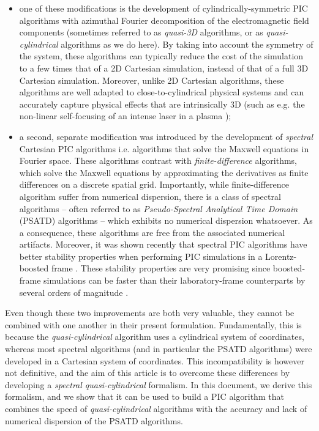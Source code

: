\documentclass[1p,times]{elsarticle}
\begin{document}
\begin{itemize}
\item one of these modifications is the development of cylindrically-symmetric
PIC algorithms with azimuthal Fourier decomposition \citep{godfrey1985iprop,Lifschitz,Davidson} 
of the electromagnetic field components 
(sometimes referred to as \emph{quasi-3D} algorithms, or as
\emph{quasi-cylindrical} algorithms as we do here). By taking
into account the symmetry of the system, these algorithms can typically reduce
the cost of the simulation to a few times that of a 2D Cartesian simulation,
instead of that of a full 3D Cartesian simulation. Moreover, unlike 2D
Cartesian algorithms, these algorithms are well adapted to close-to-cylindrical
physical systems and can accurately capture physical effects that are intrinsically
3D (such as e.g. the non-linear self-focusing of an intense laser in a
plasma \citep{EsareyRMP2009});

\item a second, separate modification was introduced by the development
  of \emph{spectral} Cartesian PIC algorithms
  \citep{Haber,BunemanJCP1980,DawsonRMP1983} i.e. algorithms that solve the
  Maxwell equations in Fourier space. These algorithms contrast with
  \emph{finite-difference} algorithms, which solve the Maxwell equations
  by approximating the derivatives as finite differences on a discrete spatial grid.
Importantly, while finite-difference algorithm suffer from
numerical dispersion, there is a class of spectral algorithms -- often referred to
as \emph{Pseudo-Spectral Analytical Time Domain} (PSATD) algorithms 
\citep{Haber,BunemanJCP1980} -- which exhibits no numerical dispersion whatsoever. As a
consequence, these algorithms are free from the associated numerical
artifacts. Moreover, it was shown recently
\citep{GodfreyJCP2014,GodfreyIEEE2014,YuJCP2014,YuCPC2015} 
that spectral PIC algorithms have better stability properties when 
performing PIC simulations in
a Lorentz-boosted frame \citep{VayPRL2007,MartinsNatPhys2010,VayJCP2011}. 
These stability properties are very
promising since boosted-frame simulations can be faster than 
their laboratory-frame counterparts by several orders of magnitude \citep{VayPRL2007}.
\end{itemize}

Even though these two improvements are both very valuable, they cannot be
combined with one another in their present
formulation. Fundamentally, this is because the \emph{quasi-cylindrical} algorithm uses a
cylindrical system of coordinates, whereas most spectral algorithms
(and in particular the PSATD algorithms)
were developed in a Cartesian system of coordinates. This
incompatibility is however not definitive, and the aim of this article
is to overcome these differences by developing a \emph{spectral
  quasi-cylindrical} formalism. In this document, we derive this formalism,
and we show that it can be used to build a PIC algorithm that combines 
the speed of \emph{quasi-cylindrical} algorithms with
the accuracy and lack of numerical dispersion of the PSATD algorithms.
\end{document}
